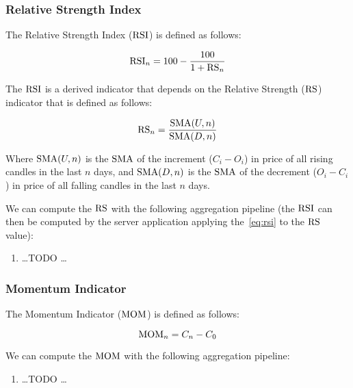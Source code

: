 \subsubsection{Relative Strength Index}

The Relative Strength Index (\(\operatorname{RSI}\)) is defined as follows:

\begin{equation}\label{eq:rsi}
	\operatorname{RSI}_n = 100 - \frac{100}{1 + \operatorname{RS}_n}
\end{equation}

The \(\operatorname{RSI}\) is a derived indicator that depends on the Relative Strength
(\(\operatorname{RS}\)) indicator that is defined as follows:

\begin{equation}\label{eq:rs}
	\operatorname{RS}_n = \frac{\operatorname{SMA}(U,n)}{\operatorname{SMA}(D,n)}
\end{equation}

Where \(\operatorname{SMA}(U,n)\) is the \(\operatorname{SMA}\) of the increment (\(C_i - O_i\)) in price of
all rising candles in the last \(n\) days, and \(\operatorname{SMA}(D,n)\) is the \(\operatorname{SMA}\) of
the decrement (\(O_i - C_i\)) in price of all falling candles in the last \(n\)
days.

We can compute the \(\operatorname{RS}\) with the following aggregation pipeline (the \(\operatorname{RSI}\)
can then be computed by the server application applying the~\eqref{eq:rsi} to
the \(\operatorname{RS}\) value):

\begin{enumerate}
	\item \ldots TODO \ldots
\end{enumerate}

\subsubsection{Momentum Indicator}

The Momentum Indicator (\(\operatorname{MOM}\)) is defined as follows:

\begin{equation}\label{eq:mom}
	\operatorname{MOM}_n = C_n - C_0
\end{equation}

We can compute the \(\operatorname{MOM}\) with the following aggregation pipeline:

\begin{enumerate}
	\item \ldots TODO \ldots
\end{enumerate}
